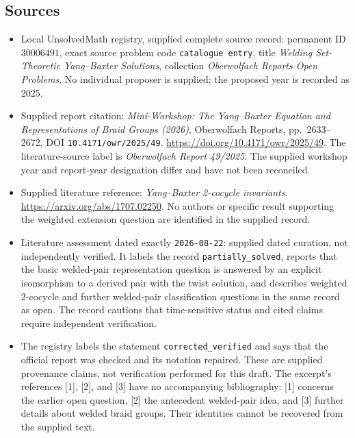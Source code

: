 \documentclass[11pt]{article}
\begin{document}
\subsection{Sources}
\begin{itemize}
\item Local UnsolvedMath registry, supplied complete source record: permanent ID \(30006491\), exact source problem code \texttt{catalogue entry}, title \emph{Welding Set-Theoretic Yang--Baxter Solutions}, collection \emph{Oberwolfach Reports Open Problems}. No individual proposer is supplied; the proposed year is recorded as 2025.
\item Supplied report citation: \emph{Mini-Workshop: The Yang--Baxter Equation and Representations of Braid Groups (2026)}, Oberwolfach Reports, pp.\ 2633--2672, DOI \texttt{10.4171/owr/2025/49}. \url{https://doi.org/10.4171/owr/2025/49}. The literature-source label is \emph{Oberwolfach Report 49/2025}. The supplied workshop year and report-year designation differ and have not been reconciled.
\item Supplied literature reference: \emph{Yang--Baxter 2-cocycle invariants}. \url{https://arxiv.org/abs/1707.02250}. No authors or specific result supporting the weighted extension question are identified in the supplied record.
\item Literature assessment dated exactly \texttt{2026-08-22}: supplied dated curation, not independently verified. It labels the record \texttt{partially\_solved}, reports that the basic welded-pair representation question is answered by an explicit isomorphism to a derived pair with the twist solution, and describes weighted \(2\)-cocycle and further welded-pair classification questions in the same record as open. The record cautions that time-sensitive status and cited claims require independent verification.
\item The registry labels the statement \texttt{corrected\_verified} and says that the official report was checked and its notation repaired. These are supplied provenance claims, not verification performed for this draft. The excerpt's references [1], [2], and [3] have no accompanying bibliography: [1] concerns the earlier open question, [2] the antecedent welded-pair idea, and [3] further details about welded braid groups. Their identities cannot be recovered from the supplied text.
\end{itemize}
\end{document}
